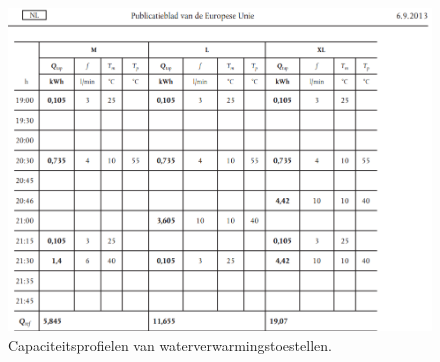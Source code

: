 \begin{figure}[H]
	\centering
	\includegraphics[width=1\columnwidth]{pictures/Profile_M3.png}
	\caption[Short title]{Capaciteitsprofielen van waterverwarmingstoestellen.}
	\label{fig:capaciteitM3}
\end{figure}
	